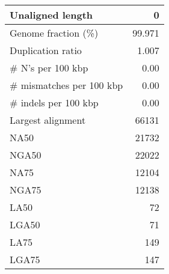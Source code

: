 \documentclass[12pt,a4paper]{article}
\begin{document}
\begin{table}[ht]
\begin{center}
\begin{tabular}{|l*{1}{|r}|}
Unaligned length & 0 \\ \hline
Genome fraction (\%) & 99.971 \\ \hline
Duplication ratio & 1.007 \\ \hline
\# N's per 100 kbp & 0.00 \\ \hline
\# mismatches per 100 kbp & 0.00 \\ \hline
\# indels per 100 kbp & 0.00 \\ \hline
Largest alignment & 66131 \\ \hline
NA50 & 21732 \\ \hline
NGA50 & 22022 \\ \hline
NA75 & 12104 \\ \hline
NGA75 & 12138 \\ \hline
LA50 & 72 \\ \hline
LGA50 & 71 \\ \hline
LA75 & 149 \\ \hline
LGA75 & 147 \\ \hline
\end{tabular}
\end{center}
\end{table}
\end{document}

